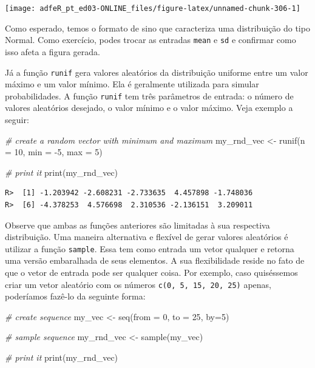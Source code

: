 \documentclass[
  11pt,
]{book}
\newenvironment{Shaded}{\begin{snugshade}}{\end{snugshade}}
\newcommand{\AttributeTok}[1]{\textcolor[rgb]{0.61,0.61,0.61}{#1}}
\newcommand{\CommentTok}[1]{\textcolor[rgb]{0.37,0.37,0.37}{\textit{#1}}}
\newcommand{\DecValTok}[1]{\textcolor[rgb]{0.06,0.06,0.06}{#1}}
\newcommand{\FunctionTok}[1]{\textcolor[rgb]{0,0,0}{#1}}
\newcommand{\NormalTok}[1]{#1}
\newcommand{\OtherTok}[1]{\textcolor[rgb]{0.37,0.37,0.37}{#1}}
\newcommand{\SpecialCharTok}[1]{\textcolor[rgb]{0,0,0}{#1}}
\begin{document}
\begin{center}\texttt{[image: adfeR\_pt\_ed03-ONLINE\_files/figure-latex/unnamed-chunk-306-1]} \end{center}

Como esperado, temos o formato de sino que caracteriza uma distribuição do tipo Normal. Como exercício, podes trocar as entradas \texttt{mean} e \texttt{sd} e confirmar como isso afeta a figura gerada.

Já a função \texttt{runif} gera valores aleatórios da distribuição uniforme entre um valor máximo e um valor mínimo. Ela é geralmente utilizada para simular probabilidades. A função \texttt{runif} tem três parâmetros de entrada: o número de valores aleatórios desejado, o valor mínimo e o valor máximo. Veja exemplo a seguir:

\begin{Shaded}
\begin{Highlighting}[]
\CommentTok{\# create a random vector with minimum and maximum}
\NormalTok{my\_rnd\_vec }\OtherTok{\textless{}{-}} \FunctionTok{runif}\NormalTok{(}\AttributeTok{n =} \DecValTok{10}\NormalTok{,}
                    \AttributeTok{min =} \SpecialCharTok{{-}}\DecValTok{5}\NormalTok{,}
                    \AttributeTok{max =} \DecValTok{5}\NormalTok{)}

\CommentTok{\# print it}
\FunctionTok{print}\NormalTok{(my\_rnd\_vec)}
\end{Highlighting}
\end{Shaded}

\begin{verbatim}
R>  [1] -1.203942 -2.608231 -2.733635  4.457898 -1.748036
R>  [6] -4.378253  4.576698  2.310536 -2.136151  3.209011
\end{verbatim}

Observe que ambas as funções anteriores são limitadas à sua respectiva distribuição. Uma maneira alternativa e flexível de gerar valores aleatórios é utilizar a função \texttt{sample}. Essa tem como entrada um vetor qualquer e retorna uma versão embaralhada de seus elementos. A sua flexibilidade reside no fato de que o vetor de entrada pode ser qualquer coisa. Por exemplo, caso quiséssemos criar um vetor aleatório com os números \texttt{c(0,\ 5,\ 15,\ 20,\ 25)} apenas, poderíamos fazê-lo da seguinte forma: 

\begin{Shaded}
\begin{Highlighting}[]
\CommentTok{\# create sequence}
\NormalTok{my\_vec }\OtherTok{\textless{}{-}} \FunctionTok{seq}\NormalTok{(}\AttributeTok{from =} \DecValTok{0}\NormalTok{, }\AttributeTok{to =} \DecValTok{25}\NormalTok{, }\AttributeTok{by=}\DecValTok{5}\NormalTok{)}

\CommentTok{\# sample sequence}
\NormalTok{my\_rnd\_vec }\OtherTok{\textless{}{-}} \FunctionTok{sample}\NormalTok{(my\_vec)}

\CommentTok{\# print it}
\FunctionTok{print}\NormalTok{(my\_rnd\_vec)}
\end{Highlighting}
\end{Shaded}
\end{document}

